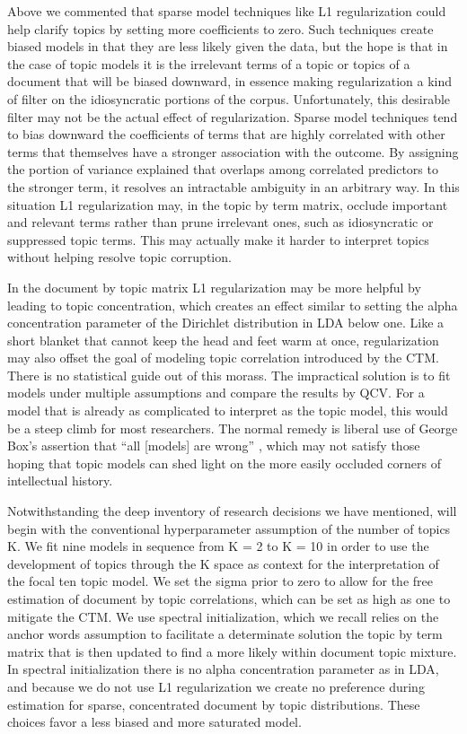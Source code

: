 \documentclass[]{book}
\theoremstyle{definition}
\theoremstyle{definition}
\theoremstyle{definition}
\theoremstyle{remark}
\begin{document}
Above we commented that sparse model techniques like L1 regularization
could help clarify topics by setting more coefficients to zero. Such
techniques create biased models in that they are less likely given the
data, but the hope is that in the case of topic models it is the
irrelevant terms of a topic or topics of a document that will be biased
downward, in essence making regularization a kind of filter on the
idiosyncratic portions of the corpus. Unfortunately, this desirable
filter may not be the actual effect of regularization. Sparse model
techniques tend to bias downward the coefficients of terms that are
highly correlated with other terms that themselves have a stronger
association with the outcome. By assigning the portion of variance
explained that overlaps among correlated predictors to the stronger
term, it resolves an intractable ambiguity in an arbitrary way. In this
situation L1 regularization may, in the topic by term matrix, occlude
important and relevant terms rather than prune irrelevant ones, such as
idiosyncratic or suppressed topic terms. This may actually make it
harder to interpret topics without helping resolve topic corruption.

In the document by topic matrix L1 regularization may be more helpful by
leading to topic concentration, which creates an effect similar to
setting the alpha concentration parameter of the Dirichlet distribution
in LDA below one. Like a short blanket that cannot keep the head and
feet warm at once, regularization may also offset the goal of modeling
topic correlation introduced by the CTM. There is no statistical guide
out of this morass. The impractical solution is to fit models under
multiple assumptions and compare the results by QCV. For a model that is
already as complicated to interpret as the topic model, this would be a
steep climb for most researchers. The normal remedy is liberal use of
George Box's assertion that ``all {[}models{]} are wrong''
\citep[582]{DiMaggio2013Exploiting}, which may not satisfy those hoping
that topic models can shed light on the more easily occluded corners of
intellectual history.

Notwithstanding the deep inventory of research decisions we have
mentioned, will begin with the conventional hyperparameter assumption of
the number of topics K. We fit nine models in sequence from K = 2 to K =
10 in order to use the development of topics through the K space as
context for the interpretation of the focal ten topic model. We set the
sigma prior to zero to allow for the free estimation of document by
topic correlations, which can be set as high as one to mitigate the CTM.
We use spectral initialization, which we recall relies on the anchor
words assumption to facilitate a determinate solution the topic by term
matrix that is then updated to find a more likely within document topic
mixture. In spectral initialization there is no alpha concentration
parameter as in LDA, and because we do not use L1 regularization we
create no preference during estimation for sparse, concentrated document
by topic distributions. These choices favor a less biased and more
saturated model.
\end{document}
